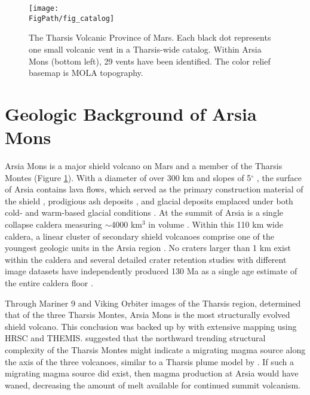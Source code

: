 \begin{figure}
\centering
\texttt{[image: \\FigPath/fig\_catalog]}
\caption[The Tharsis Volcanic Province of Mars.]{The Tharsis Volcanic Province of Mars. Each black dot represents one small volcanic vent in a Tharsis-wide catalog. Within Arsia Mons (bottom left), 29 vents have been identified. The color relief basemap is MOLA topography.}
\label{fig_locatormap}
\end{figure}

\section{Geologic Background of Arsia Mons}

Arsia Mons is a major shield volcano on Mars and a member of the Tharsis Montes (Figure \ref{fig_locatormap}). With a diameter of over 300 km and slopes of 5$^{\circ}$ \citep{plescia2004morphometric}, the surface of Arsia contains lava flows, which served as the primary construction material of the shield \citep{mouginis2008lava}, prodigious ash deposits \citep{mouginis2002prodigious}, and glacial deposits \citep{head2003cold} emplaced under both cold- and warm-based glacial conditions \citep{scanlon2015volcanism}. At the summit of Arsia is a single collapse caldera measuring $\sim$4000 km$^3$ in volume \citep{wilson2001evidence}. Within this 110 km wide caldera, a linear cluster of secondary shield volcanoes comprise one of the youngest geologic units in the Arsia region \citep{carr1977some,scott1995geologic}. No craters larger than 1 km exist within the caldera and several detailed crater retention studies with different image datasets have independently produced 130 Ma as a single age estimate of the entire caldera floor \citep{neukum2004recent,werner2009global,robbins2011volcanic}.

Through Mariner 9 and Viking Orbiter images of the Tharsis region, \citet{crumpler1978structural} determined that of the three Tharsis Montes, Arsia Mons is the most structurally evolved shield volcano. This conclusion was backed up by \citet{bleacher2007tharsis} with extensive mapping using HRSC and THEMIS. \citet{bleacher2007tharsis} suggested that the northward trending structural complexity of the Tharsis Montes might indicate a migrating magma source along the axis of the three volcanoes, similar to a Tharsis plume model by \citet{mege1996plume}. If such a migrating magma source did exist, then magma production at Arsia would have waned, decreasing the amount of melt available for continued summit volcanism.

